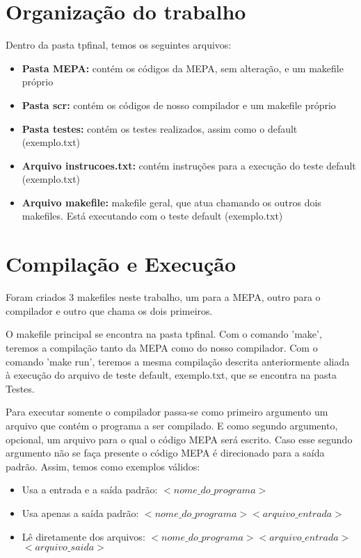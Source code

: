 \documentclass[a4paper,12pt]{article}
\begin{document}
\section{Organização do trabalho}
Dentro da pasta tpfinal, temos os seguintes arquivos:
\begin{itemize}
 \item \textbf{Pasta MEPA:} contém os códigos da MEPA, sem alteração, e um makefile próprio
 \item \textbf{Pasta scr:} contém os códigos de nosso compilador e um makefile próprio
 \item \textbf{Pasta testes:} contém os testes realizados, assim como o default (exemplo.txt)
\item \textbf{Arquivo instrucoes.txt:} contém instruções para a execução do teste default (exemplo.txt)
\item \textbf{Arquivo makefile:} makefile geral, que atua chamando os outros dois makefiles. Está executando com o teste default (exemplo.txt)
\end{itemize}

\section{Compilação e Execução}
Foram criados 3 makefiles neste trabalho, um para a MEPA, outro para o compilador e outro que chama os dois primeiros. 

O makefile principal se encontra na pasta tpfinal. Com o comando 'make', teremos a compilação tanto da MEPA como do nosso compilador. Com o comando 'make run', teremos a mesma compilação descrita anteriormente aliada à execução do arquivo de teste default, exemplo.txt, que se encontra na pasta Testes.

Para executar somente o compilador passa-se como primeiro argumento um arquivo que contém o programa a ser compilado. E como segundo argumento, opcional, um arquivo para o qual o código MEPA será escrito. Caso esse segundo argumento não se faça presente o código MEPA é direcionado para a saída padrão. Assim, temos como exemplos válidos: 
\begin{itemize}
 \item Usa a entrada e a saída padrão: \textit{$<nome\_do\_programa>$ }
 \item Usa apenas a saída padrão: \textit{$<nome\_do\_programa> <arquivo\_entrada>$}
\item Lê diretamente dos arquivos: \textit{$<nome\_do\_programa> <arquivo\_entrada>$ $<arquivo\_saida>$}
\end{itemize}
\end{document}
